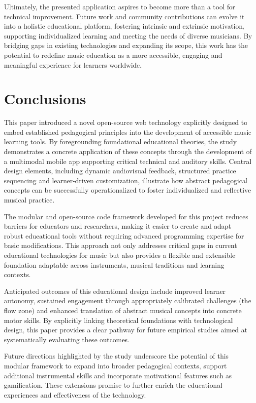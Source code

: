 \documentclass[runningheads]{llncs}
\begin{document}
Ultimately, the presented application aspires to become more than a tool for technical improvement. Future work and community contributions can evolve it into a holistic educational platform, fostering intrinsic and extrinsic motivation, supporting individualized learning and meeting the needs of diverse musicians. By bridging gaps in existing technologies and expanding its scope, this work has the potential to redefine music education as a more accessible, engaging and meaningful experience for learners worldwide.


\section{Conclusions}
\label{sec:Conclusions}

This paper introduced a novel open-source web technology explicitly designed to embed established pedagogical principles into the development of accessible music learning tools. By foregrounding foundational educational theories, the study demonstrates a concrete application of these concepts through the development of a multimodal mobile app supporting critical technical and auditory skills.
Central design elements, including dynamic audiovisual feedback, structured practice sequencing and learner-driven customization, illustrate how abstract pedagogical concepts can be successfully operationalized to foster individualized and reflective musical practice.

The modular and open-source code framework developed for this project reduces barriers for educators and researchers, making it easier to create and adapt robust educational tools without requiring advanced programming expertise for basic modifications. This approach not only addresses critical gaps in current educational technologies for music but also provides a flexible and extensible foundation adaptable across instruments, musical traditions and learning contexts.

Anticipated outcomes of this educational design include improved learner autonomy, sustained engagement through appropriately calibrated challenges (the flow zone) and enhanced translation of abstract musical concepts into concrete motor skills. By explicitly linking theoretical foundations with technological design, this paper provides a clear pathway for future empirical studies aimed at systematically evaluating these outcomes.

Future directions highlighted by the study underscore the potential of this modular framework to expand into broader pedagogical contexts, support additional instrumental skills and incorporate motivational features such as gamification. These extensions promise to further enrich the educational experiences and effectiveness of the technology.
\end{document}
